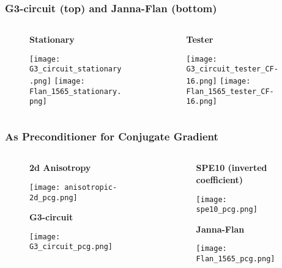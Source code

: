 \documentclass[xcolor=dvipsnames]{beamer}
\begin{document}
\begin{frame}
  \frametitle{G3-circuit (top) and Janna-Flan (bottom)}
  \begin{columns}
    \begin{column}{0.49\textwidth}
    \begin{figure}
    \centering
    \textbf{Stationary}
    
    \texttt{[image: G3\_circuit\_stationary.png]}
    \texttt{[image: Flan\_1565\_stationary.png]}
    \end{figure}
    \end{column}

    \begin{column}{0.49\textwidth}
    \begin{figure}
    \centering
    \textbf{Tester}
    
    \texttt{[image: G3\_circuit\_tester\_CF-16.png]}
    \texttt{[image: Flan\_1565\_tester\_CF-16.png]}
    \end{figure}
    \end{column}
  \end{columns}
\end{frame}

\begin{frame}
  \frametitle{As Preconditioner for Conjugate Gradient}
  \begin{columns}
    \begin{column}{0.49\textwidth}
    \begin{figure}
    \centering
    \textbf{2d Anisotropy}
    
    \texttt{[image: anisotropic-2d\_pcg.png]}

    \textbf{G3-circuit}

    \texttt{[image: G3\_circuit\_pcg.png]}
    \end{figure}
    \end{column}

    \begin{column}{0.49\textwidth}
    \begin{figure}
    \centering
      \textbf{SPE10 (inverted coefficient)}
    
    \texttt{[image: spe10\_pcg.png]}

    \textbf{Janna-Flan}

    \texttt{[image: Flan\_1565\_pcg.png]}
    \end{figure}
    \end{column}
  \end{columns}
\end{frame}
\end{document}
